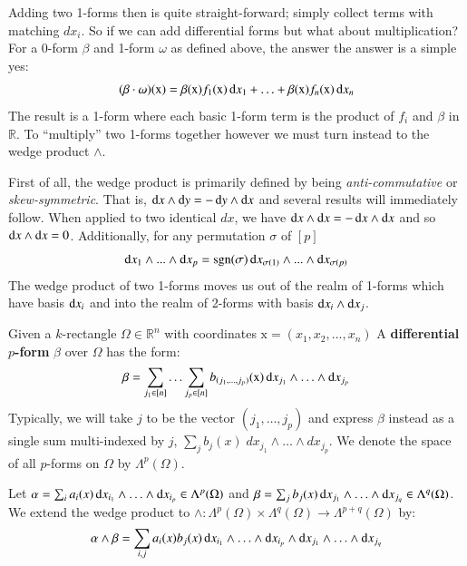 Adding two 1-forms then is quite straight-forward; simply collect terms with matching $dx_i$.
So if we can add differential forms but what about multiplication?
For a 0-form $\beta$ and 1-form $\omega$ as defined above, the answer the answer is a simple yes:
\begin{equation}
	(\beta \cdot \omega)(\text{x}) 
		= \beta(\text{x})f_1(\text{x}) \mathop{}\!\mathrm{d} x_1 
		+ \ldots  
		+ \beta(\text{x})f_n(\text{x}) \mathop{}\!\mathrm{d} x_n
\end{equation}
The result is a 1-form where each basic 1-form term is the product of $f_i$ and $\beta$ in $\mathbb{R}$.
To ``multiply'' two 1-forms together however we must turn instead to the wedge product $\wedge$.

First of all, the wedge product is primarily defined by being \emph{anti-commutative} or \emph{skew-symmetric}.
That is, $\mathop{}\!\mathrm{d} x \wedge \mathop{}\!\mathrm{d} y = -\mathop{}\!\mathrm{d} y \wedge \mathop{}\!\mathrm{d} x$ and several results will immediately follow.
When applied to two identical $dx$, we have $\mathop{}\!\mathrm{d} x \wedge \mathop{}\!\mathrm{d} x = - \mathop{}\!\mathrm{d} x \wedge \mathop{}\!\mathrm{d} x$ 
and so $\mathop{}\!\mathrm{d} x \wedge \mathop{}\!\mathrm{d} x = 0$.
Additionally, for any permutation $\sigma$ of $[p]$
\begin{equation}
	\mathop{}\!\mathrm{d} x_1 \wedge ... \wedge \mathop{}\!\mathrm{d} x_p 
	= \text{sgn}(\sigma) \mathop{}\!\mathrm{d} x_{\sigma(1)} \wedge ... \wedge \mathop{}\!\mathrm{d} x_{\sigma(p)}
\end{equation}
The wedge product of two 1-forms moves us out of the realm of 1-forms which have basis $\mathop{}\!\mathrm{d} x_i$ and into the 
realm of 2-forms with basis $\mathop{}\!\mathrm{d} x_i \wedge \mathop{}\!\mathrm{d} x_j$.


\begin{definition}
	Given a $k$-rectangle $\Omega \in \mathbb{R}^n$ with coordinates $\text{x} = (x_1, x_2, \ldots, x_n)$
	A \textbf{differential $p$-form} $\beta$ over $\Omega$ has the form:
	\begin{equation}
		\beta = \sum_{j_1 \in [n]} \ldots \sum_{j_p \in [n]} b_{(j_1, \ldots, j_p)}(\text{x})
				\mathop{}\!\mathrm{d} x_{j_1} \wedge \ldots \wedge \mathop{}\!\mathrm{d} x_{j_p}
	\end{equation}
	Typically, we will take $j$ to be the vector $(j_1, \ldots, j_p)$ 
	and express $\beta$ instead as a single sum multi-indexed
	by $j$, $\sum_j b_j(x) \; dx_{j_1} \wedge \ldots \wedge dx_{j_p}$.
	We denote the space of all $p$-forms on $\Omega$ by $\Lambda^p(\Omega)$.
\end{definition}


\begin{definition}
	Let $\alpha = \sum_i a_i(x) \mathop{}\!\mathrm{d} x_{i_1} \wedge \ldots \wedge \mathop{}\!\mathrm{d} x_{i_p} \in \Lambda^p(\Omega)$ 
	and $\beta = \sum_j b_j(x) \mathop{}\!\mathrm{d} x_{j_1} \wedge \ldots \wedge \mathop{}\!\mathrm{d} x_{j_q} \in \Lambda^q(\Omega)$. 
	We extend the wedge product to 
	$\wedge : \Lambda^p(\Omega) \times \Lambda^q(\Omega) \to \Lambda^{p+q}(\Omega)$ by:
	\begin{equation}
		\alpha \wedge \beta  = \sum_{i,j} a_i(x) b_j(x)
			\mathop{}\!\mathrm{d} x_{i_1} \wedge \ldots \wedge \mathop{}\!\mathrm{d} x_{i_p} \wedge 
			\mathop{}\!\mathrm{d} x_{j_1} \wedge \ldots \wedge \mathop{}\!\mathrm{d} x_{j_q}
	\end{equation}
\end{definition}


